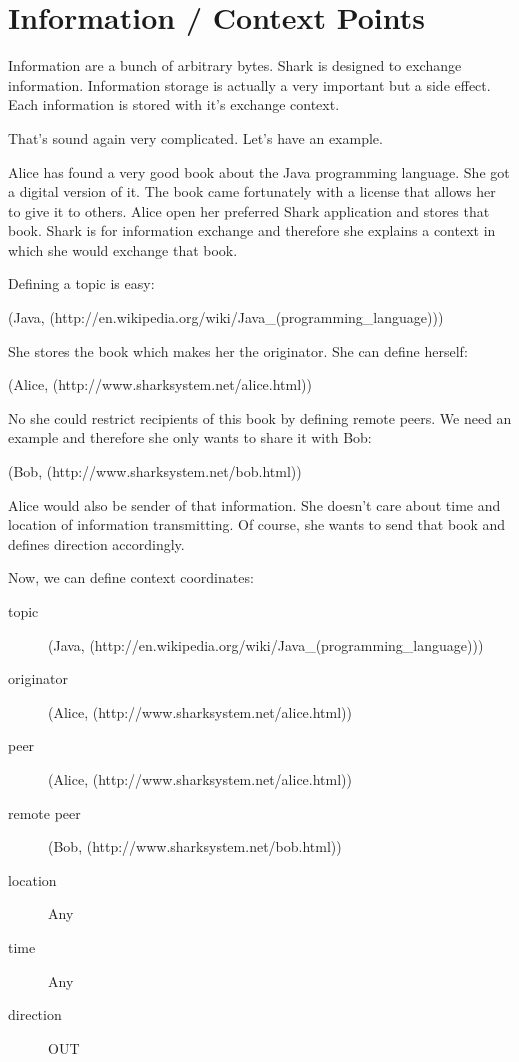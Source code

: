 \section{Information / Context Points}
Information are a bunch of arbitrary bytes. Shark is designed to exchange information. Information storage is actually a very important but a side effect. 
Each information is stored with it's exchange context.

That's sound again very complicated. Let's have an example.

Alice has found a very good book about the Java programming language. She got a digital version of it. The book came fortunately with a license that allows her to give it to others. Alice open her preferred Shark application and stores that book. Shark is for information exchange and therefore she explains a context in which she would exchange that book.

Defining a topic is easy: 

(Java, (http://en.wikipedia.org/wiki/Java\_(programming\_language)))

She stores the book which makes her the originator. She can define herself:

(Alice, (http://www.sharksystem.net/alice.html))

No she could restrict recipients of this book by defining remote peers. We need an example and therefore she only wants to share it with Bob:

(Bob, (http://www.sharksystem.net/bob.html))

Alice would also be sender of that information. She doesn't care about time and location of information transmitting. Of course, she wants to send that book and defines direction accordingly.

Now, we can define context coordinates:

\begin{description}
    \item[topic] 
(Java, (http://en.wikipedia.org/wiki/Java\_(programming\_language)))
    \item[originator] 
(Alice, (http://www.sharksystem.net/alice.html))
    \item[peer] 
(Alice, (http://www.sharksystem.net/alice.html))
    \item[remote peer] 
(Bob, (http://www.sharksystem.net/bob.html))
    \item[location] 
Any
    \item[time] 
Any
    \item[direction] 
OUT
\end{description}

